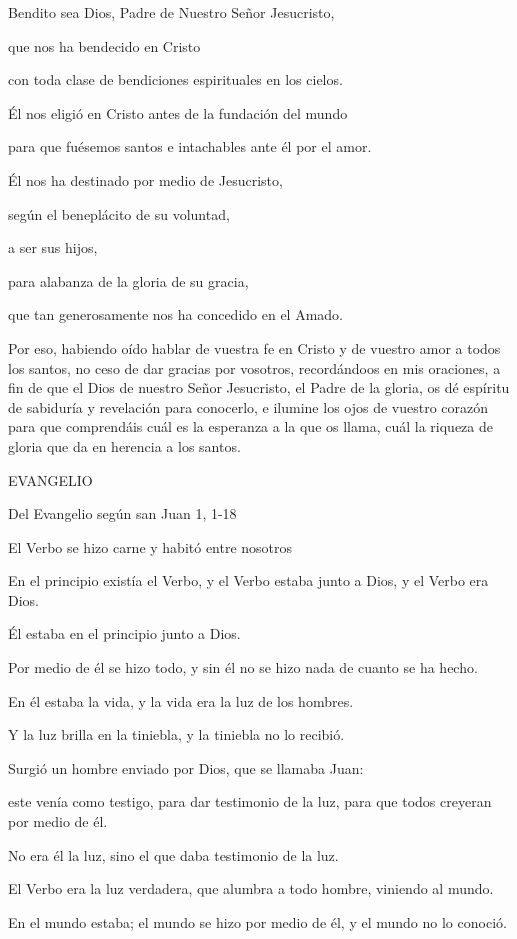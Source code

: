 Bendito sea Dios, Padre de Nuestro Señor Jesucristo,

que nos ha bendecido en Cristo

con toda clase de bendiciones espirituales en los cielos.

Él nos eligió en Cristo antes de la fundación del mundo

para que fuésemos santos e intachables ante él por el amor.

Él nos ha destinado por medio de Jesucristo,

según el beneplácito de su voluntad,

a ser sus hijos,

para alabanza de la gloria de su gracia,

que tan generosamente nos ha concedido en el Amado.

Por eso, habiendo oído hablar de vuestra fe en Cristo y de vuestro amor
a todos los santos, no ceso de dar gracias por vosotros, recordándoos en
mis oraciones, a fin de que el Dios de nuestro Señor Jesucristo, el
Padre de la gloria, os dé espíritu de sabiduría y revelación para
conocerlo, e ilumine los ojos de vuestro corazón para que comprendáis
cuál es la esperanza a la que os llama, cuál la riqueza de gloria que da
en herencia a los santos.

EVANGELIO

Del Evangelio según san Juan 1, 1-18

El Verbo se hizo carne y habitó entre nosotros

En el principio existía el Verbo, y el Verbo estaba junto a Dios, y el
Verbo era Dios.

Él estaba en el principio junto a Dios.

Por medio de él se hizo todo, y sin él no se hizo nada de cuanto se ha
hecho.

En él estaba la vida, y la vida era la luz de los hombres.

Y la luz brilla en la tiniebla, y la tiniebla no lo recibió.

Surgió un hombre enviado por Dios, que se llamaba Juan:

este venía como testigo, para dar testimonio de la luz, para que todos
creyeran por medio de él.

No era él la luz, sino el que daba testimonio de la luz.

El Verbo era la luz verdadera, que alumbra a todo hombre, viniendo al
mundo.

En el mundo estaba; el mundo se hizo por medio de él, y el mundo no lo
conoció.

